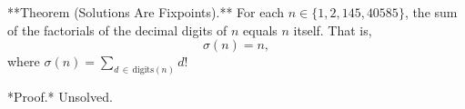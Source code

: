 
**Theorem (Solutions Are Fixpoints).** For each $n \in \{1, 2, 145, 40585\}$, the sum of the factorials of the decimal digits of $n$ equals $n$ itself. That is,
$$\sigma(n) = n,$$
where $\sigma(n) = \sum_{d \,\in\, \text{digits}(n)} d!$

*Proof.* Unsolved.